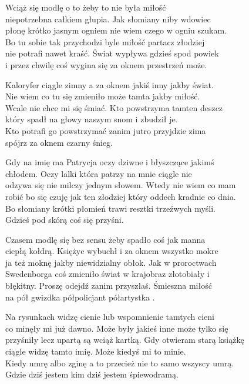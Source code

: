 \begin{textn}

    Wciąż się modlę o to żeby to nie była miłość\\
    niepotrzebna całkiem głupia. Jak słomiany niby wdowiec\\
    płonę krótko jasnym ogniem nie wiem czego w ogniu szukam.\\
    Bo tu sobie tak przychodzi byle miłość partacz złodziej\\
    nie potrafi nawet kraść. Świat wypływa gdzieś spod powiek\\
    i przez chwilę coś wygina się za oknem przestrzeń może.

    Kaloryfer ciągle zimny a za oknem jakiś inny jakby świat.\\
    Nie wiem co tu się zmieniło może tamta jakby miłość.\\
    Wcale nie chce mi się śmiać. Kto powstrzyma tamten deszcz\\
    który spadł na głowy naszym snom i zbudził je.\\
    Kto potrafi go powstrzymać zanim jutro przyjdzie zima\\
    spójrz za oknem czarny śnieg.

    Gdy na imię ma Patrycja oczy dziwne i błyszczące jakimś\\
    chłodem. Oczy lalki która patrzy na mnie ciągle nie\\
    odzywa się nie milczy jednym słowem. Wtedy nie wiem co mam\\
    robić bo się czuję jak ten złodziej który oddech kradnie co dnia.\\
    Bo słomiany krótki płomień trawi resztki trzeźwych myśli.\\
    Gdzieś pod skórą coś się przyśni.

    Czasem modlę się bez sensu żeby spadło coś jak manna\\
    ciepłą kołdrą. Księżyc wybuchł i za oknem wszystko mokre\\
    ja też moknę jakby niewidzialny obłok. Jak w proroctwach\\
    Swedenborga coś zmieniło świat w krajobraz złotobiały i\\
    błękitny. Proszę odejdź zanim przyszłaś. Śmieszna miłość\\
    na pół gwizdka półpolicjant półartystka .

    Na rysunkach widzę cienie lub wspomnienie tamtych cieni\\
    co minęły mi już dawno. Może były jakieś inne może tylko się\\
    przyśniły lecz upartą są wciąż kartką. Gdy otwieram starą książkę\\
    ciągle widzę tamto imię. Może kiedyś mi to minie.\\
    Kiedy umrę albo zginę a to przecież nie to samo wszyscy umrą.\\
    Gdzie dziś jestem kim dziś jestem śpiewodramą.


\end{textn}
